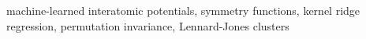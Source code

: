 machine-learned interatomic potentials, symmetry functions, kernel ridge regression, permutation invariance, Lennard-Jones clusters
